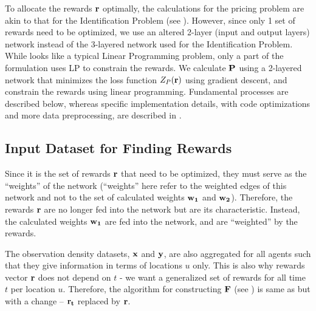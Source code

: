 To allocate the rewards $\mathbf{r}$ optimally, the calculations for the pricing problem are akin to that for the Identification Problem (see ). However, since only 1 set of rewards need to be optimized, we use an altered 2-layer (input and output layers) network instead of the 3-layered network used for the Identification Problem. While  looks like a typical Linear Programming problem, only a part of the formulation uses LP to constrain the rewards. We calculate $\mathbf{P}$ using a 2-layered network that minimizes the loss function $Z_P(\mathbf{r})$ using gradient descent, and constrain the rewards using linear programming. Fundamental processes are described below, whereas specific implementation details, with code optimizations and more data preprocessing, are described in .

\subsection{Input Dataset for Finding Rewards}
Since it is the set of rewards $\mathbf{r}$ that need to be optimized, they must serve as the ``weights'' of the network (``weights'' here refer to the weighted edges of this network and not to the set of calculated weights $\mathbf{w_1}$ and $\mathbf{w_2}$). Therefore, the rewards $\mathbf{r}$ are no longer fed into the network but are its characteristic. Instead, the calculated weights $\mathbf{w_1}$ are fed into the network, and are ``weighted'' by the rewards.

The observation density datasets, $\mathbf{x}$ and $\mathbf{y}$, are also aggregated for all agents such that they give information in terms of locations $u$ only. This is also why rewards vector $\mathbf{r}$ does not depend on $t$ - we want a generalized set of rewards for all time $t$ per location $u$. Therefore, the algorithm for constructing $\mathbf{F}$ (see ) is same as  but with a change -- $\mathbf{r_t}$ replaced by $\mathbf{r}$.

